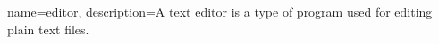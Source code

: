 
{
	name={editor},
	description={A text editor is a type of program used for editing plain text files.}
}